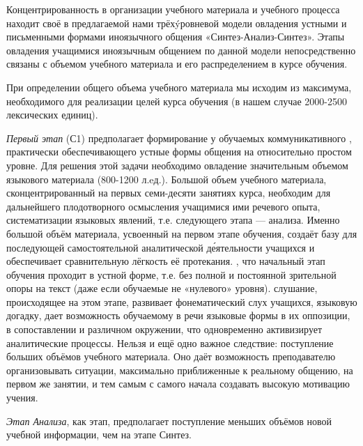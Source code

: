 Концентрированность в организации учебного материала и учебного процесса находит своё  в предлагаемой нами трёх\'{y}ровневой модели овладения устными и письменными формами иноязычного общения «Синтез-Анализ-Синтез». Этапы овладения учащимися иноязычным общением по данной модели непосредственно связаны с объемом учебного материала и его распределением в курсе обучения.

При определении общего объема учебного материала мы исходим из максимума, необходимого для реализации целей курса обучения (в нашем случае 2000-2500 лексических единиц).

\textit{Первый этап} (С1) предполагает формирование у обучаемых коммуникативного ,
практически обеспечивающего устные формы общения на относительно простом уровне. Для решения этой задачи необходимо овладение значительным объемом языкового материала (800-1200 л.eд.).
Большой объем учебного материала, сконцентрированный на первых семи-десяти занятиях курса, необходим для дальнейшего плодотворного осмысления учащимися
 ими речевого опыта, систематизации языковых явлений, т.е. следующего этапа --- анализа.
Именно большой объём материала, усвоенный на первом этапе обучения, создаёт базу для последующей самостоятельной аналитической д\'{е}ятельности учащихся и обеспечивает сравнительную лёгкость её протекания. ,
что начальный этап обучения проходит в устной форме, т.е. без полной и постоянной зрительной опоры на текст (даже если обучаемые не «нулевого» уровня).  слушание, происходящее на этом этапе, развивает фонематический слух учащихся, языковую догадку, дает возможность обучаемому  в речи языковые формы в их оппозиции, в сопоставлении и различном окружении, что одновременно активизирует аналитические процессы.
Нельзя  и ещё одно важное следствие: поступление больших объёмов учебного материала. Оно даёт возможность преподавателю организовывать ситуации, максимально приближенные к реальному общению, на первом же занятии, и тем самым с самого начала создавать высокую мотивацию учения.

\textit{Этап Анализа}, как  этап, предполагает поступление меньших объёмов новой учебной информации, чем на этапе Синтез.

